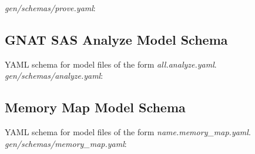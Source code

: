 \begin{appendices}
\textit{gen/schemas/prove.yaml}:

\subsection{GNAT SAS Analyze Model Schema}
YAML schema for model files of the form \textit{all.analyze.yaml}. \\

\textit{gen/schemas/analyze.yaml}:

\subsection{Memory Map Model Schema}
YAML schema for model files of the form \textit{name.memory\_map.yaml}. \\

\textit{gen/schemas/memory\_map.yaml}:

\end{appendices}


